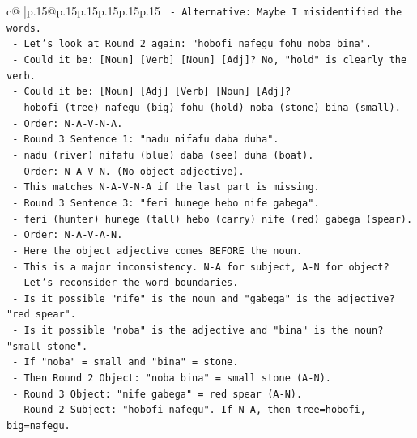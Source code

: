 \documentclass{article}
\begin{document}
{\begin{supertabular}{c@{$\;$}|p{.15\linewidth}@{}p{.15\linewidth}p{.15\linewidth}p{.15\linewidth}p{.15\linewidth}p{.15\linewidth}}
{{{\texttt{       {-} Alternative: Maybe I misidentified the words.} \\
\texttt{       {-} Let's look at Round 2 again: "hobofi nafegu fohu noba bina".} \\
\texttt{         {-} Could it be: {[}Noun{]} {[}Verb{]} {[}Noun{]} {[}Adj{]}? No, "hold" is clearly the verb.} \\
\texttt{         {-} Could it be: {[}Noun{]} {[}Adj{]} {[}Verb{]} {[}Noun{]} {[}Adj{]}?} \\
\texttt{           {-} hobofi (tree) nafegu (big) fohu (hold) noba (stone) bina (small).} \\
\texttt{           {-} Order: N{-}A{-}V{-}N{-}A.} \\
\texttt{         {-} Round 3 Sentence 1: "nadu nifafu daba duha".} \\
\texttt{           {-} nadu (river) nifafu (blue) daba (see) duha (boat).} \\
\texttt{           {-} Order: N{-}A{-}V{-}N. (No object adjective).} \\
\texttt{           {-} This matches N{-}A{-}V{-}N{-}A if the last part is missing.} \\
\texttt{         {-} Round 3 Sentence 3: "feri hunege hebo nife gabega".} \\
\texttt{           {-} feri (hunter) hunege (tall) hebo (carry) nife (red) gabega (spear).} \\
\texttt{           {-} Order: N{-}A{-}V{-}A{-}N.} \\
\texttt{           {-} Here the object adjective comes BEFORE the noun.} \\
\texttt{       {-} This is a major inconsistency. N{-}A for subject, A{-}N for object?} \\
\texttt{       {-} Let's reconsider the word boundaries.} \\
\texttt{       {-} Is it possible "nife" is the noun and "gabega" is the adjective? "red spear".} \\
\texttt{       {-} Is it possible "noba" is the adjective and "bina" is the noun? "small stone".} \\
\texttt{       {-} If "noba" = small and "bina" = stone.} \\
\texttt{       {-} Then Round 2 Object: "noba bina" = small stone (A{-}N).} \\
\texttt{       {-} Round 3 Object: "nife gabega" = red spear (A{-}N).} \\
\texttt{       {-} Round 2 Subject: "hobofi nafegu". If N{-}A, then tree=hobofi, big=nafegu.} \\
}}}
\end{supertabular}}
\end{document}
